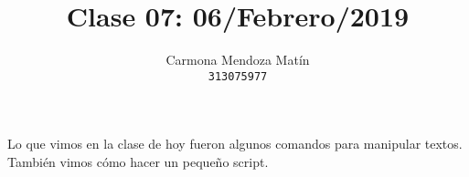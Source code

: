 \documentclass[11pt, a4paper]{report}
\begin{document}
\title{Clase 07: 06/Febrero/2019}
\author{
  Carmona Mendoza Mat\'in\\
  \texttt{313075977}
}
\date{}
\maketitle

Lo que vimos en la clase de hoy fueron algunos comandos para manipular textos. \\

Tambi\'en vimos c\'omo hacer un pequeño script.
\end{document}
